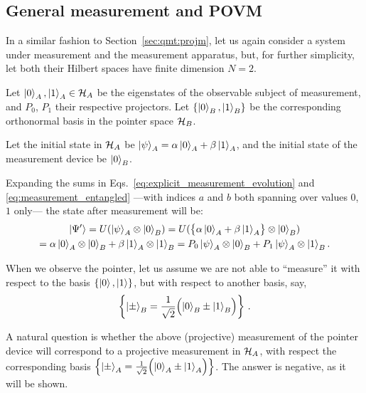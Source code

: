 \subsection{General measurement and POVM}
\label{subsec:POVM}

In a similar fashion to
Section~\ref{sec:qmt:projm},
let us again consider
a system under measurement
and the measurement apparatus,
but, for further simplicity, let both their Hilbert spaces have finite dimension $N=2$.

Let $\ket{0}_A, \ket{1}_A \in \mathcal{H}_A$ be the eigenstates 
of the observable subject of measurement,
and $P_0$, $P_1$ their respective projectors.
Let $\qty{\ket{0}_B, \ket{1}_B}$ be the corresponding orthonormal basis in the pointer space $\mathcal{H}_B$.

Let the initial state in $\mathcal{H}_A$ be $\ket{\psi}_A = \alpha\ket{0}_A + \beta\ket{1}_A$,
and the initial state of the measurement device be $\ket{0}_B$.

Expanding the sums in Eqs.~\eqref{eq:explicit_measurement_evolution}
and \eqref{eq:measurement_entangled}
---with indices $a$ and $b$ both spanning over values $0$, $1$ only---
the state after measurement will be:
\begin{multline}\label{eq:qubit_ortho_measurement}
        \ket{\Psi'}
    = U( \ket{\psi}_A \otimes \ket{0}_B )
    = U( \qty\big{\alpha\ket{0}_A + \beta\ket{1}_A} \otimes \ket{0}_B )
    \\
    = \alpha\ket{0}_A \otimes \ket{0}_B + \beta\ket{1}_A  \otimes \ket{1}_B
    = P_0\ket{\psi}_A \otimes \ket{0}_B + P_1\ket{\psi}_A \otimes \ket{1}_B \text{.}
\end{multline}

When we observe the pointer, let us assume we are not
able to ``measure'' it with respect to the basis
$\left\{\ket{0}, \ket{1}\right\}$,
but with respect to another basis, say,
\begin{equation}\label{eq:pmbasis}
\left\{\ket{\pm}_B = \frac{1}{\sqrt{2}} \qty\Big(\ket{0}_B \pm \ket{1}_B)\right\} \,\text{.}
\end{equation}

A natural question is whether the above (projective) measurement
of the pointer device
will correspond to a projective
measurement in $\mathcal{H}_A$,
with respect the corresponding basis
$\left\{\ket{\pm}_A = \frac{1}{\sqrt{2}} \qty\Big(\ket{0}_A \pm \ket{1}_A)\right\}$.
The answer is negative, as it will be shown.

